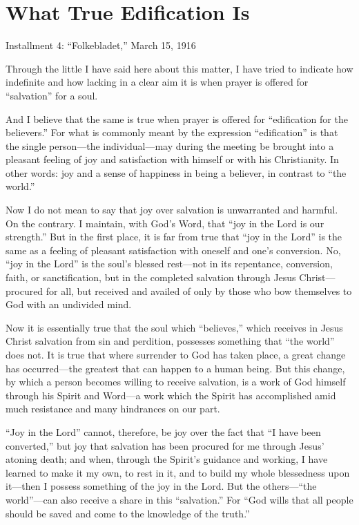
\section{What True Edification Is}

Installment 4: “Folkebladet,” March 15, 1916

Through the little I have said here about this matter, I have tried to indicate how indefinite and how lacking in a clear aim it is when prayer is offered for “salvation” for a soul.

And I believe that the same is true when prayer is offered for “edification for the believers.” For what is commonly meant by the expression “edification” is that the single person—the individual—may during the meeting be brought into a pleasant feeling of joy and satisfaction with himself or with his Christianity. In other words: joy and a sense of happiness in being a believer, in contrast to “the world.”

Now I do not mean to say that joy over salvation is unwarranted and harmful. On the contrary. I maintain, with God’s Word, that “joy in the Lord is our strength.” But in the first place, it is far from true that “joy in the Lord” is the same as a feeling of pleasant satisfaction with oneself and one’s conversion. No, “joy in the Lord” is the soul’s blessed rest—not in its repentance, conversion, faith, or sanctification, but in the completed salvation through Jesus Christ—procured for all, but received and availed of only by those who bow themselves to God with an undivided mind.

Now it is essentially true that the soul which “believes,” which receives in Jesus Christ salvation from sin and perdition, possesses something that “the world” does not. It is true that where surrender to God has taken place, a great change has occurred—the greatest that can happen to a human being. But this change, by which a person becomes willing to receive salvation, is a work of God himself through his Spirit and Word—a work which the Spirit has accomplished amid much resistance and many hindrances on our part.

“Joy in the Lord” cannot, therefore, be joy over the fact that “I have been converted,” but joy that salvation has been procured for me through Jesus’ atoning death; and when, through the Spirit’s guidance and working, I have learned to make it my own, to rest in it, and to build my whole blessedness upon it—then I possess something of the joy in the Lord. But the others—“the world”—can also receive a share in this “salvation.” For “God wills that all people should be saved and come to the knowledge of the truth.”

